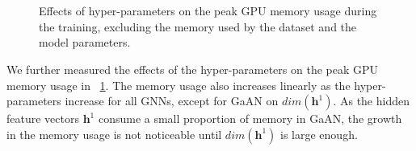 \begin{figure}
    \centering
    \\
    \\
    \caption{Effects of hyper-parameters on the peak GPU memory usage during the training, excluding the memory used by the dataset and the model parameters.}
    \label{fig:exp_hyperparameter_memory_usage}
\end{figure}

We further measured the effects of the hyper-parameters on the peak GPU memory usage in \figurename~\ref{fig:exp_hyperparameter_memory_usage}.
The memory usage also increases linearly as the hyper-parameters increase for all GNNs, except for GaAN on $dim(\boldsymbol{h}^1)$.
As the hidden feature vectors $\boldsymbol{h}^1$ consume a small proportion of memory in GaAN, the growth in the memory usage is not noticeable until $dim(\boldsymbol{h}^1)$ is large enough.

